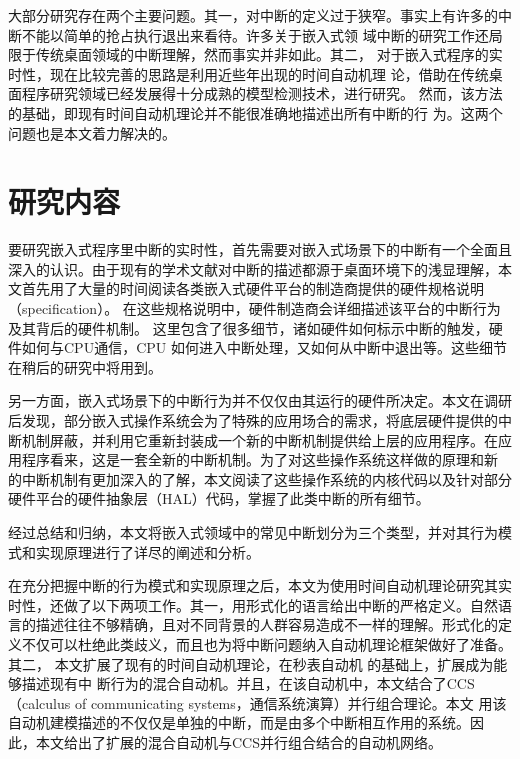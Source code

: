 大部分研究存在两个主要问题。其一，对中断的定义过于狭窄。事实上有许多的中
断不能以简单的抢占\pozhehao 执行\pozhehao 退出来看待。许多关于嵌入式领
域中断的研究工作还局限于传统桌面领域的中断理解，然而事实并非如此。其二，
对于嵌入式程序的实时性，现在比较完善的思路是利用近些年出现的时间自动机理
论，借助在传统桌面程序研究领域已经发展得十分成熟的模型检测技术，进行研究。
然而，该方法的基础，即现有时间自动机理论并不能很准确地描述出所有中断的行
为。这两个问题也是本文着力解决的。

\section{研究内容}
\label{sec:subject}

要研究嵌入式程序里中断的实时性，首先需要对嵌入式场景下的中断有一个全面且
深入的认识。由于现有的学术文献对中断的描述都源于桌面环境下的浅显理解，本
文首先用了大量的时间阅读各类嵌入式硬件平台的制造商提供的硬件规格说明（specification）。
在这些规格说明中，硬件制造商会详细描述该平台的中断行为及其背后的硬件机制。
这里包含了很多细节，诸如硬件如何标示中断的触发，硬件如何与CPU通信，CPU
如何进入中断处理，又如何从中断中退出等。这些细节在稍后的研究中将用到。

另一方面，嵌入式场景下的中断行为并不仅仅由其运行的硬件所决定。本文在调研
后发现，部分嵌入式操作系统会为了特殊的应用场合的需求，将底层硬件提供的中
断机制屏蔽，并利用它重新封装成一个新的中断机制提供给上层的应用程序。在应
用程序看来，这是一套全新的中断机制。为了对这些操作系统这样做的原理和新
的中断机制有更加深入的了解，本文阅读了这些操作系统的内核代码以及针对部分
硬件平台的硬件抽象层（HAL）代码，掌握了此类中断的所有细节。

经过总结和归纳，本文将嵌入式领域中的常见中断划分为三个类型，并对其行为模
式和实现原理进行了详尽的阐述和分析。

在充分把握中断的行为模式和实现原理之后，本文为使用时间自动机理论研究其实
时性，还做了以下两项工作。其一，用形式化的语言给出中断的严格定义。自然语
言的描述往往不够精确，且对不同背景的人群容易造成不一样的理解。形式化的定
义不仅可以杜绝此类歧义，而且也为将中断问题纳入自动机理论框架做好了准备。其二，
本文扩展了现有的时间自动机理论，在秒表自动机\cite{Abdeddaim:2002:PJS:646486.694487}
的基础上，扩展成为能够描述现有中
断行为的混合自动机。并且，在该自动机中，本文结合了CCS（calculus of communicating systems，通信系统演算）并行组合\cite{Milner:1989:CC:534666}理论。本文
用该自动机建模描述的不仅仅是单独的中断，而是由多个中断相互作用的系统。因
此，本文给出了扩展的混合自动机与CCS并行组合结合的自动机网络。

